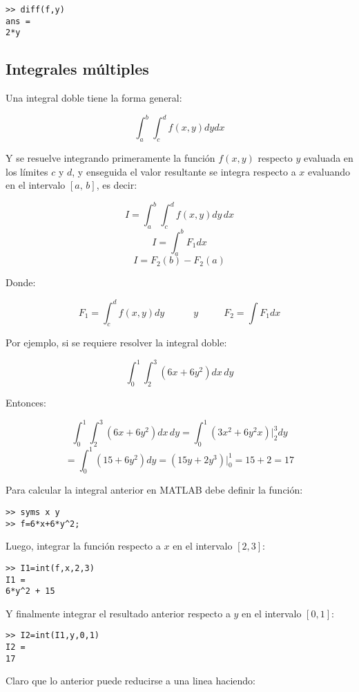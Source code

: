 \begin{verbatim}
>> diff(f,y)
ans =
2*y
\end{verbatim}

\subsection{Integrales múltiples}

Una integral doble  tiene la forma general:

$$\int_a^b \int_c^d f(x,y) dy dx$$

Y se resuelve integrando primeramente la función $f(x,y)$ respecto $y$ evaluada en los límites $c$ y $d$, y enseguida 
el valor resultante se integra respecto a $x$ evaluando en el intervalo $[a,\, b]$, es decir:

$$I=\int_a^b \int_c^d f(x,y) dy \, dx$$
$$I=\int_a^b  F_1  dx$$
$$I=F_2(b) - F_2(a)$$

Donde:

$$
F_1 = \int_c^d f(x,y) dy
\,\,\,\,\,\,\,\,\,\,\,\,\,\,\,\,\,\, y \,\,\,\,\,\,\,\,\,\,\,\,\,\,\,\,
F_2 = \int F_1 dx
$$

Por ejemplo, si se requiere resolver la integral doble:

$$\int_0^1 \int_2^3 \left( 6x+6y^2 \right) dx \, dy$$

Entonces:

$$
\int_0^1 \int_2^3 \left( 6x+6y^2 \right) dx \, dy = 
\int_0^1 \left(3x^2+6y^2x\right)\bigg|_2^3 dy
$$
$$
= \int_0^1 \left(15+6y^2\right) dy = 
\left( 15y + 2y^3\right) \bigg|_0^1 = 15 + 2 = 17
$$

Para calcular la integral anterior en MATLAB debe definir la función:

\begin{verbatim}
>> syms x y
>> f=6*x+6*y^2;
\end{verbatim}

Luego, integrar la función respecto a $x$ en el intervalo $[2,3]$:

\begin{verbatim}
>> I1=int(f,x,2,3)
I1 =
6*y^2 + 15
\end{verbatim}

Y finalmente integrar el resultado anterior respecto a $y$ en el intervalo $[0,1]$:

\begin{verbatim}
>> I2=int(I1,y,0,1)
I2 =
17
\end{verbatim}

Claro que lo anterior puede reducirse a una linea haciendo:

